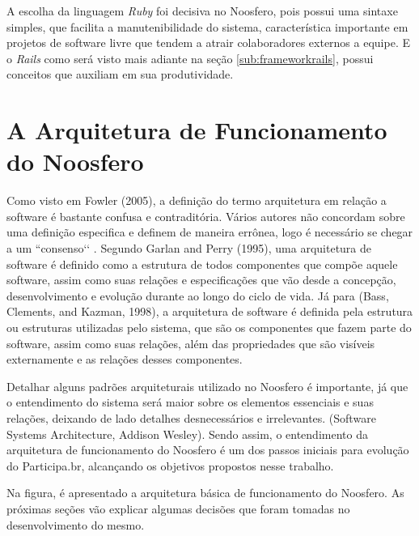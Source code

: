 A escolha da linguagem \textit{Ruby} foi decisiva no Noosfero, pois possui uma sintaxe simples, que facilita a manutenibilidade do sistema, característica importante em projetos de software livre que tendem a atrair colaboradores externos a equipe. E o \textit{Rails} como será visto mais adiante na seção \ref{sub:frameworkrails}, possui conceitos que auxiliam em sua produtividade. %

\section{A Arquitetura de Funcionamento do Noosfero}

Como visto em Fowler (2005), a definição do termo arquitetura em relação a software é bastante confusa e contraditória. Vários autores não concordam sobre uma definição especifica e definem de maneira errônea, logo é necessário se chegar a um ``consenso‘‘ . Segundo Garlan and Perry (1995), uma arquitetura de software é definido como a estrutura de todos componentes que compõe aquele software, assim como suas relações e especificações que vão desde a concepção, desenvolvimento e evolução durante ao longo do ciclo de vida. Já para (Bass, Clements, and Kazman, 1998), a arquitetura de software é definida pela estrutura ou estruturas utilizadas pelo sistema, que são os componentes que fazem parte do software, assim como suas relações, além das propriedades que são visíveis externamente e as relações desses componentes.

Detalhar alguns padrões arquiteturais utilizado no Noosfero é importante, já que o entendimento do sistema será maior sobre os elementos essenciais e suas relações, deixando de lado detalhes desnecessários e irrelevantes. (Software Systems Architecture, Addison Wesley). Sendo assim, o entendimento da arquitetura de funcionamento do Noosfero é um dos passos iniciais para evolução do Participa.br, alcançando os objetivos propostos nesse trabalho.

Na figura, é apresentado a arquitetura básica de funcionamento do Noosfero. As próximas seções vão explicar algumas decisões que foram tomadas no desenvolvimento do mesmo.

